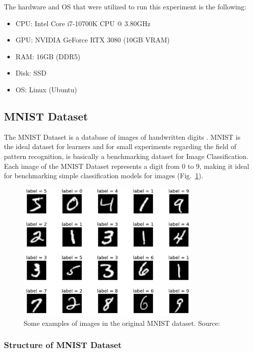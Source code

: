 The hardware and OS that were utilized to run this experiment is the following:
\begin{itemize}[itemsep=0.1cm]
	\item CPU: Intel Core i7-10700K CPU @ 3.80GHz
	\item GPU: NVIDIA GeForce RTX 3080 (10GB VRAM)
	\item RAM: 16GB (DDR5)
	\item Disk: SSD
	\item OS: Linux (Ubuntu)
\end{itemize}

\subsection{MNIST Dataset}

The MNIST Dataset is a database of images of handwritten digits \cite{MNIST}.
MNIST is the ideal dataset for learners and for small experiments regarding the field of pattern recognition, is basically a benchmarking dataset for Image Classification.
\\[0.3cm]Each image of the MNIST Dataset represents a digit from 0 to 9, making it ideal for benchmarking simple classification models for images (Fig.~\ref{fig:figure-4.1.3}).
\begin{figure}[t]
	\centering
	\includegraphics[width=9cm]{figures/figure-4.1.3.png}
	\caption[Examples of MNIST Images]{Some examples of images in the original MNIST dataset. Source:~\cite{MNIST}}
	\label{fig:figure-4.1.3}
\end{figure}

\subsubsection{Structure of MNIST Dataset}

